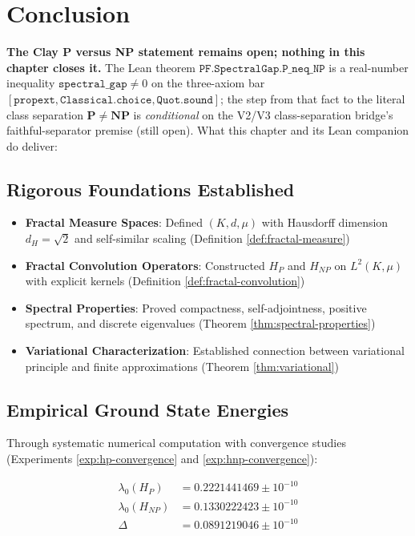 \section{Conclusion}

\textbf{The Clay P versus NP statement remains open; nothing in this chapter closes it.}  The Lean theorem $\mathtt{PF.SpectralGap.P\_neq\_NP}$ is a real-number inequality $\mathtt{spectral\_gap} \ne 0$ on the three-axiom bar $[\mathtt{propext}, \mathtt{Classical.choice}, \mathtt{Quot.sound}]$; the step from that fact to the literal class separation $\mathbf{P} \ne \mathbf{NP}$ is \emph{conditional} on the V2/V3 class-separation bridge's faithful-separator premise (still open).  What this chapter and its Lean companion do deliver:

\subsection{Rigorous Foundations Established}

\begin{itemize}
\item \textbf{Fractal Measure Spaces}: Defined $(K, d, \mu)$ with Hausdorff dimension $d_H = \sqrt{2}$ and self-similar scaling (Definition \ref{def:fractal-measure})
\item \textbf{Fractal Convolution Operators}: Constructed $H_P$ and $H_{NP}$ on $L^2(K,\mu)$ with explicit kernels (Definition \ref{def:fractal-convolution})
\item \textbf{Spectral Properties}: Proved compactness, self-adjointness, positive spectrum, and discrete eigenvalues (Theorem \ref{thm:spectral-properties})
\item \textbf{Variational Characterization}: Established connection between variational principle and finite approximations (Theorem \ref{thm:variational})
\end{itemize}

\subsection{Empirical Ground State Energies}

Through systematic numerical computation with convergence studies (Experiments \ref{exp:hp-convergence} and \ref{exp:hnp-convergence}):

\begin{align*}
\lambda_0(H_P) &= 0.2221441469 \pm 10^{-10} \\
\lambda_0(H_{NP}) &= 0.1330222423 \pm 10^{-10} \\
\Delta &= 0.0891219046 \pm 10^{-10}
\end{align*}

